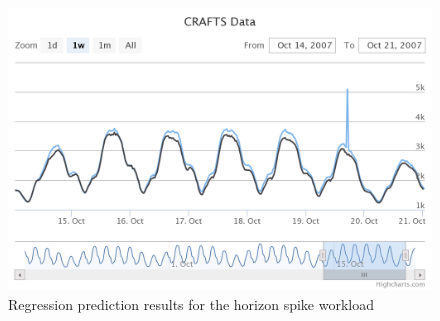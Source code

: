 \begin{figure}[H]
\centering
\includegraphics[width=\textwidth]{results/graphs/regression_horizon_spike.png}
\caption{Regression prediction results for the horizon spike workload}
\label{fig:regression_hs}
\end{figure}